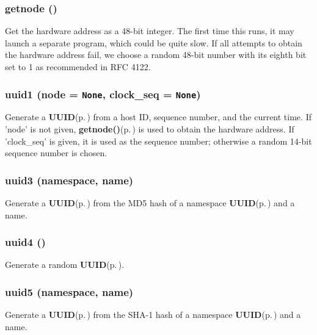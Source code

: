 \subsubsection{\setlength{\rightskip}{0pt plus 5cm}getnode ()}\label{uuid_8py_a6}


Get the hardware address as a 48-bit integer. The first time this runs, it may launch a separate program, which could be quite slow. If all attempts to obtain the hardware address fail, we choose a random 48-bit number with its eighth bit set to 1 as recommended in RFC 4122. 
\subsubsection{\setlength{\rightskip}{0pt plus 5cm}uuid1 (node = {\tt None}, clock\_\-seq = {\tt None})}\label{uuid_8py_a7}


Generate a {\bf UUID}{\rm (p.\,\pageref{classUUID})} from a host ID, sequence number, and the current time. If 'node' is not given, {\bf getnode()}{\rm (p.\,\pageref{uuid_8py_a6})} is used to obtain the hardware address. If 'clock\_\-seq' is given, it is used as the sequence number; otherwise a random 14-bit sequence number is chosen. 
\subsubsection{\setlength{\rightskip}{0pt plus 5cm}uuid3 (namespace, name)}\label{uuid_8py_a8}


Generate a {\bf UUID}{\rm (p.\,\pageref{classUUID})} from the MD5 hash of a namespace {\bf UUID}{\rm (p.\,\pageref{classUUID})} and a name. 
\subsubsection{\setlength{\rightskip}{0pt plus 5cm}uuid4 ()}\label{uuid_8py_a9}


Generate a random {\bf UUID}{\rm (p.\,\pageref{classUUID})}. 
\subsubsection{\setlength{\rightskip}{0pt plus 5cm}uuid5 (namespace, name)}\label{uuid_8py_a10}


Generate a {\bf UUID}{\rm (p.\,\pageref{classUUID})} from the SHA-1 hash of a namespace {\bf UUID}{\rm (p.\,\pageref{classUUID})} and a name. 